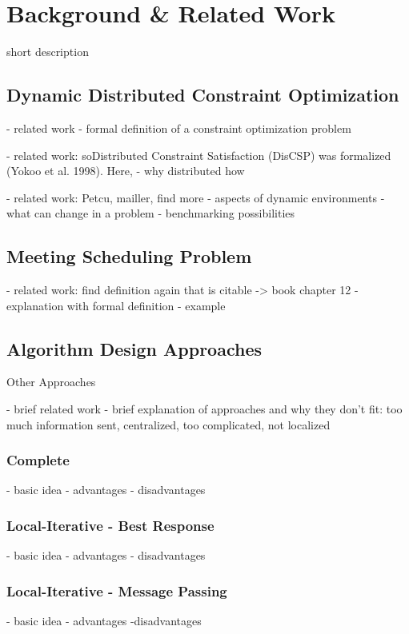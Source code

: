 \chapter{Background \& Related Work}

short description
    
\section{Dynamic Distributed Constraint Optimization}

    - related work
    - formal definition of a constraint optimization problem
    
    - related work: soDistributed Constraint Satisfaction (DisCSP) was formalized (Yokoo et al. 1998). Here,
    - why distributed how
    
    - related work: Petcu, mailler, find more
    - aspects of dynamic environments
    - what can change in a problem
    - benchmarking possibilities

\section{Meeting Scheduling Problem}   
    - related work: find definition again that is citable -> book chapter 12
    - explanation with formal definition
    - example

\section{Algorithm Design Approaches}

    Other Approaches

    - brief related work
    - brief explanation of approaches and why they don't fit: too much information sent, centralized, too complicated, not localized
    
\subsection{Complete}

    - basic idea
    - advantages
    - disadvantages

\subsection{Local-Iterative - Best Response}

    - basic idea
    - advantages
    - disadvantages

\subsection{Local-Iterative - Message Passing}

    - basic idea
    - advantages
    -disadvantages